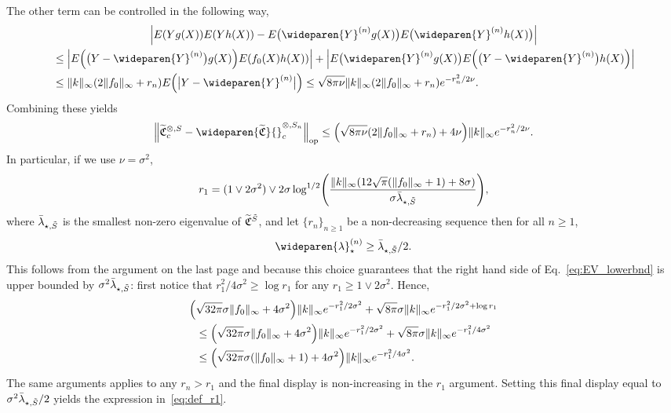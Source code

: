 \documentclass[10pt]{amsart}
\theoremstyle{definition}\newtheorem{defi}[theo]{Definition}\newtheorem{rema}[theo]{Remark}\newtheorem{exam}[theo]{Example}\newtheorem{exem}[theo]{Example}\newtheorem{nota}[theo]{Notation}
\theoremstyle{remark}
\DeclareMathOperator{\opp}{op}
\newcommand{\fkC}{\mathfrak{C}}
\newcommand{\Cov}{\tilde{\fkC}}
\newcommand{\CovCapn}{\wideparen{\widetilde{\fkC}}{\vphantom{\fkC}}^{\otimes,S_n}_c}
\let\oldtilde\tilde
\renewcommand*{\tilde}[1]{\mathchoice{\widetilde{#1}}{\widetilde{#1}}{\oldtilde{#1}}{\oldtilde{#1}}}
\let\originalleft\left
\let\originalright\right
\renewcommand{\left}{\mathopen{}\mathclose\bgroup\originalleft}
\renewcommand{\right}{\aftergroup\egroup\originalright}
\begin{document}
The other term can be controlled in the following way,
\begin{multline*}
\left|E(Y g(X)) E(Y h(X)) - E\bigl(\wideparen{Y}^{(n)} g(X)\bigr) E\bigl(\wideparen{Y}^{(n)} h(X)\bigr)\right| \\
\begin{aligned}
&\leq\left| E\left(\bigl(Y - \wideparen{Y}^{(n)}\bigr) g(X)\right) E(f_0(X) h(X))\right| + \left|E\bigl(\wideparen{Y}^{(n)} g(X)\bigr) E\left(\bigl(Y - \wideparen{Y}^{(n)}\bigr) h(X)\right)\right| \\
&\leq \|k\|_\infty (2 \|f_0\|_\infty + r_n) E\left(\bigl|Y - \wideparen{Y}^{(n)}\bigr|\right) \leq \sqrt{8 \pi \nu} \|k\|_\infty (2\|f_0\|_\infty + r_n) e^{-r_n^2/2\nu}.
\end{aligned}
\end{multline*}
Combining these yields
\begin{equation}\label{eq:EV_lowerbnd}
\left\| \tilde{\fkC}^{\otimes,S}_c - \CovCapn \right\|_{\opp} \leq \left(\sqrt{8 \pi \nu} (2\|f_0\|_\infty + r_n) + 4 \nu\right) \|k\|_\infty e^{-r_n^2/2\nu}.
\end{equation}
In particular, if we use $\nu = \sigma^2$,
\begin{equation}\label{eq:def_r1}
r_1 = (1 \vee 2 \sigma^2) \vee 2 \sigma \log^{1/2} \left(
\frac{ \|k\|_\infty \left(12 \sqrt{\pi} (\|f_0\|_\infty + 1) + 8 \sigma\right) }{\sigma \bar \lambda_{\star,\tilde S}}
\right),
\end{equation}
where $\bar \lambda_{\star,\tilde S}$ is the smallest non-zero eigenvalue of $\Cov^{\tilde S}$, and let $\{r_n\}_{n\geq 1}$ be a non-decreasing sequence then for all $n \geq 1$,
\[
\wideparen{\lambda}_\star^{(n)} \geq \bar \lambda_{\star,\tilde S} /2.
\]
This follows from the argument on the last page and because this choice guarantees that the right hand side of Eq.~\eqref{eq:EV_lowerbnd} is upper bounded by $\sigma^2 \bar \lambda_{\star,\tilde S}$: first notice that $r_1^2/4 \sigma^2 \geq \log r_1$ for any $r_1 \geq 1 \vee 2 \sigma^2$. Hence,
\begin{multline*}
\left(\sqrt{32 \pi} \sigma \|f_0\|_\infty + 4 \sigma^2\right) \|k\|_\infty e^{-r_1^2/2\sigma^2} + \sqrt{8 \pi} \sigma \|k\|_\infty e^{-r_1^2 / 2\sigma^2 + \log r_1} \\
\begin{aligned}
&\leq \left(\sqrt{32 \pi} \sigma \|f_0\|_\infty + 4 \sigma^2\right) \|k\|_\infty e^{-r_1^2/2\sigma^2} + \sqrt{8 \pi} \sigma \|k\|_\infty e^{-r_1^2 / 4\sigma^2} \\
&\leq \left(\sqrt{32 \pi} \sigma (\|f_0\|_\infty +1) + 4 \sigma^2\right) \|k\|_\infty e^{-r_1^2/4\sigma^2}.
\end{aligned}
\end{multline*}
The same arguments applies to any $r_n > r_1$ and the final display is non-increasing in the $r_1$ argument. Setting this final display equal to $\sigma^2 \bar \lambda_{\star,\tilde S} /2$ yields the expression in~\eqref{eq:def_r1}.
\end{document}
